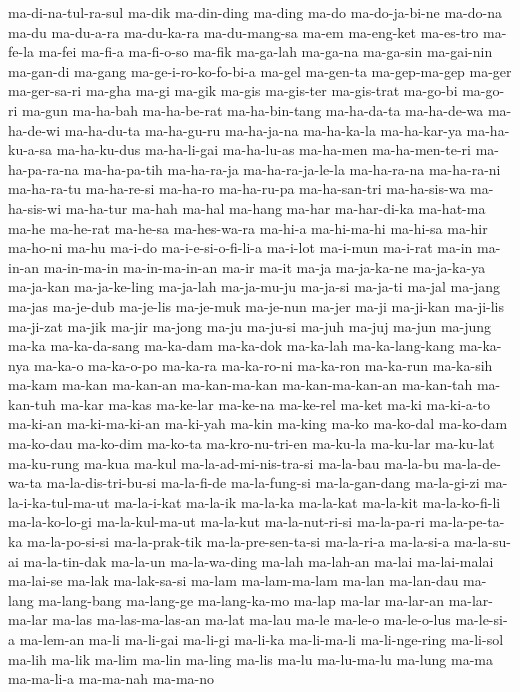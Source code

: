 {ma-di-na-tul-ra-sul ma-dik ma-din-ding ma-ding ma-do ma-do-ja-bi-ne
ma-do-na ma-du ma-du-a-ra ma-du-ka-ra ma-du-mang-sa ma-em ma-eng-ket
ma-es-tro ma-fe-la ma-fei ma-fi-a ma-fi-o-so ma-fik ma-ga-lah ma-ga-na
ma-ga-sin ma-gai-nin ma-gan-di ma-gang ma-ge-i-ro-ko-fo-bi-a ma-gel
ma-gen-ta ma-gep-ma-gep ma-ger ma-ger-sa-ri ma-gha ma-gi ma-gik ma-gis
ma-gis-ter ma-gis-trat ma-go-bi ma-go-ri ma-gun ma-ha-bah ma-ha-be-rat
ma-ha-bin-tang ma-ha-da-ta ma-ha-de-wa ma-ha-de-wi ma-ha-du-ta ma-ha-gu-ru
ma-ha-ja-na ma-ha-ka-la ma-ha-kar-ya ma-ha-ku-a-sa ma-ha-ku-dus
ma-ha-li-gai ma-ha-lu-as ma-ha-men ma-ha-men-te-ri ma-ha-pa-ra-na
ma-ha-pa-tih ma-ha-ra-ja ma-ha-ra-ja-le-la ma-ha-ra-na ma-ha-ra-ni
ma-ha-ra-tu ma-ha-re-si ma-ha-ro ma-ha-ru-pa ma-ha-san-tri ma-ha-sis-wa
ma-ha-sis-wi ma-ha-tur ma-hah ma-hal ma-hang ma-har ma-har-di-ka ma-hat-ma
ma-he ma-he-rat ma-he-sa ma-hes-wa-ra ma-hi-a ma-hi-ma-hi ma-hi-sa ma-hir
ma-ho-ni ma-hu ma-i-do ma-i-e-si-o-fi-li-a ma-i-lot ma-i-mun ma-i-rat
ma-in ma-in-an ma-in-ma-in ma-in-ma-in-an ma-ir ma-it ma-ja ma-ja-ka-ne
ma-ja-ka-ya ma-ja-kan ma-ja-ke-ling ma-ja-lah ma-ja-mu-ju ma-ja-si
ma-ja-ti ma-jal ma-jang ma-jas ma-je-dub ma-je-lis ma-je-muk ma-je-nun
ma-jer ma-ji ma-ji-kan ma-ji-lis ma-ji-zat ma-jik ma-jir ma-jong ma-ju
ma-ju-si ma-juh ma-juj ma-jun ma-jung ma-ka ma-ka-da-sang ma-ka-dam
ma-ka-dok ma-ka-lah ma-ka-lang-kang ma-ka-nya ma-ka-o ma-ka-o-po ma-ka-ra
ma-ka-ro-ni ma-ka-ron ma-ka-run ma-ka-sih ma-kam ma-kan ma-kan-an
ma-kan-ma-kan ma-kan-ma-kan-an ma-kan-tah ma-kan-tuh ma-kar ma-kas
ma-ke-lar ma-ke-na ma-ke-rel ma-ket ma-ki ma-ki-a-to ma-ki-an
ma-ki-ma-ki-an ma-ki-yah ma-kin ma-king ma-ko ma-ko-dal ma-ko-dam
ma-ko-dau ma-ko-dim ma-ko-ta ma-kro-nu-tri-en ma-ku-la ma-ku-lar ma-ku-lat
ma-ku-rung ma-kua ma-kul ma-la-ad-mi-nis-tra-si ma-la-bau ma-la-bu
ma-la-de-wa-ta ma-la-dis-tri-bu-si ma-la-fi-de ma-la-fung-si
ma-la-gan-dang ma-la-gi-zi ma-la-i-ka-tul-ma-ut ma-la-i-kat ma-la-ik
ma-la-ka ma-la-kat ma-la-kit ma-la-ko-fi-li ma-la-ko-lo-gi ma-la-kul-ma-ut
ma-la-kut ma-la-nut-ri-si ma-la-pa-ri ma-la-pe-ta-ka ma-la-po-si-si
ma-la-prak-tik ma-la-pre-sen-ta-si ma-la-ri-a ma-la-si-a ma-la-su-ai
ma-la-tin-dak ma-la-un ma-la-wa-ding ma-lah ma-lah-an ma-lai ma-lai-malai
ma-lai-se ma-lak ma-lak-sa-si ma-lam ma-lam-ma-lam ma-lan ma-lan-dau
ma-lang ma-lang-bang ma-lang-ge ma-lang-ka-mo ma-lap ma-lar ma-lar-an
ma-lar-ma-lar ma-las ma-las-ma-las-an ma-lat ma-lau ma-le ma-le-o
ma-le-o-lus ma-le-si-a ma-lem-an ma-li ma-li-gai ma-li-gi ma-li-ka
ma-li-ma-li ma-li-nge-ring ma-li-sol ma-lih ma-lik ma-lim ma-lin ma-ling
ma-lis ma-lu ma-lu-ma-lu ma-lung ma-ma ma-ma-li-a ma-ma-nah ma-ma-no
}
